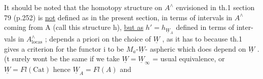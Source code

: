  It should be noted that the  homotopy structure
on $A^\wedge$ envisioned in th.1  section 79 (p.252)  is \uline{not}  defined
as in the present section,  in terms of intervals in $A^\wedge$ coming from A
(call this structure h),  \uline{but as} $h' = h_{\underline{W}_A}$ defined in terms of inter-%
vals in $A^\wedge_{\mathrm{locas}}$ ;   depends a priori on the choice of $\underline{W}$ ,  as it
has to because th.1  gives a criterion for the functor i to be $M_a$-$\underline{W}$-%
aspheric which does depend on $\underline{W}$ . (t surely wont be the same if we take
$\underline{W} = \underline{W}_\infty$  =  usual  equivalence,  or $\underline{W} = Fl(\mathrm{Cat})$  hence $\underline{W}_A = Fl(A)$  and

